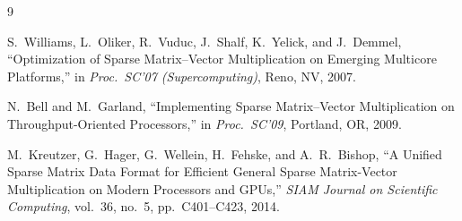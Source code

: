 \documentclass[11pt]{article}
\begin{document}
\begin{thebibliography}{9}

S.\ Williams, L.\ Oliker, R.\ Vuduc, J.\ Shalf, K.\ Yelick, and J.\ Demmel,
``Optimization of Sparse Matrix--Vector Multiplication on Emerging
Multicore Platforms,''
in \emph{Proc.\ SC'07 (Supercomputing)}, Reno, NV, 2007.

N.\ Bell and M.\ Garland,
``Implementing Sparse Matrix--Vector Multiplication on Throughput-Oriented
Processors,''
in \emph{Proc.\ SC'09}, Portland, OR, 2009.

M.\ Kreutzer, G.\ Hager, G.\ Wellein, H.\ Fehske, and A.\ R.\ Bishop,
``A Unified Sparse Matrix Data Format for Efficient General
Sparse Matrix-Vector Multiplication on Modern Processors and GPUs,''
\emph{SIAM Journal on Scientific Computing}, vol.\ 36, no.\ 5,
pp.\ C401--C423, 2014.

\end{thebibliography}
\end{document}
